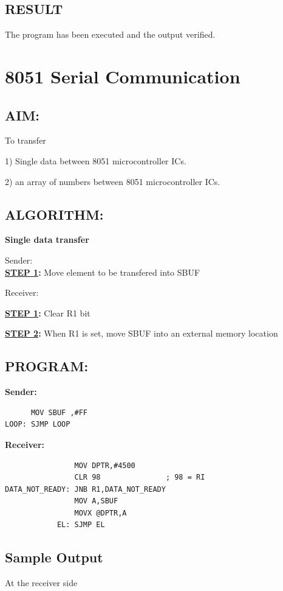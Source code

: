 \documentclass[a4paper,28pt]{report}
\begin{document}
\section*{RESULT}
The program has been executed and the output verified.
%
%
%
%
\chapter{8051 Serial Communication}
\section*{AIM:}
To transfer 

 1) Single data between 8051 microcontroller ICs.
  
 2) an array of numbers  between 8051 microcontroller ICs.

\section*{ALGORITHM:}
\textbf{Single data transfer}

\large{Sender:}\\

\textbf{\underline{STEP 1}:} Move element to be transfered into SBUF

\vspace*{10pt}
\large{Receiver:}

\textbf{\underline{STEP 1}:} Clear R1 bit 

\textbf{\underline{STEP 2}:} When R1 is set, move SBUF into an external memory location



\section*{PROGRAM:}
\textbf{Sender:}
\begin{lstlisting}
      MOV SBUF ,#FF
LOOP: SJMP LOOP
\end{lstlisting}

\newpage

\textbf{Receiver:}
\begin{lstlisting}
                MOV DPTR,#4500
                CLR 98               ; 98 = RI 
DATA_NOT_READY: JNB R1,DATA_NOT_READY
                MOV A,SBUF
                MOVX @DPTR,A
            EL: SJMP EL
\end{lstlisting}




\section*{Sample Output}
At the receiver side
\end{document}
